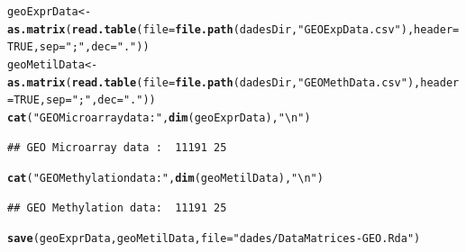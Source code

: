 \documentclass[a4paper,10pt]{article}\usepackage[]{graphicx}\usepackage[]{xcolor}
\makeatletter
\newcommand{\hlnum}[1]{\textcolor[rgb]{0.686,0.059,0.569}{#1}}%
\newcommand{\hlstr}[1]{\textcolor[rgb]{0.192,0.494,0.8}{#1}}%
\newcommand{\hlstd}[1]{\textcolor[rgb]{0.345,0.345,0.345}{#1}}%
\newcommand{\hlkwb}[1]{\textcolor[rgb]{0.69,0.353,0.396}{#1}}%
\newcommand{\hlkwc}[1]{\textcolor[rgb]{0.333,0.667,0.333}{#1}}%
\newcommand{\hlkwd}[1]{\textcolor[rgb]{0.737,0.353,0.396}{\textbf{#1}}}%
\newenvironment{kframe}{%
 \def\at@end@of@kframe{}%
 \ifinner\ifhmode%
  \def\at@end@of@kframe{\end{minipage}}%
  \begin{minipage}{\columnwidth}%
 \fi\fi%
 \def\FrameCommand##1{\hskip\@totalleftmargin \hskip-\fboxsep
 \colorbox{shadecolor}{##1}\hskip-\fboxsep
     \hskip-\linewidth \hskip-\@totalleftmargin \hskip\columnwidth}%
 \MakeFramed {\advance\hsize-\width
   \@totalleftmargin\z@ \linewidth\hsize
   \@setminipage}}%
 {\par\unskip\endMakeFramed%
 \at@end@of@kframe}
\newenvironment{knitrout}{}{} %
\makeatother
\begin{document}
\begin{knitrout}
\color{fgcolor}\begin{kframe}
\begin{alltt}
\hlstd{geoExprData} \hlkwb{<-}  \hlkwd{as.matrix}\hlstd{(}\hlkwd{read.table}\hlstd{(}\hlkwc{file}\hlstd{=}\hlkwd{file.path}\hlstd{(dadesDir,}\hlstr{"GEOExpData.csv"}\hlstd{),} \hlkwc{header}\hlstd{=}\hlnum{TRUE}\hlstd{,} \hlkwc{sep}\hlstd{=}\hlstr{";"}\hlstd{,} \hlkwc{dec}\hlstd{=}\hlstr{"."}\hlstd{))}
\hlstd{geoMetilData} \hlkwb{<-}  \hlkwd{as.matrix}\hlstd{(}\hlkwd{read.table}\hlstd{(}\hlkwc{file}\hlstd{=}\hlkwd{file.path}\hlstd{(dadesDir,}\hlstr{"GEOMethData.csv"}\hlstd{),} \hlkwc{header}\hlstd{=}\hlnum{TRUE}\hlstd{,} \hlkwc{sep}\hlstd{=}\hlstr{";"}\hlstd{,} \hlkwc{dec}\hlstd{=}\hlstr{"."}\hlstd{))}
\hlkwd{cat}\hlstd{(}\hlstr{"GEO Microarray data : "}\hlstd{,} \hlkwd{dim}\hlstd{(geoExprData),} \hlstr{"\textbackslash{}n"}\hlstd{)}
\end{alltt}
\begin{verbatim}
## GEO Microarray data :  11191 25
\end{verbatim}
\begin{alltt}
\hlkwd{cat}\hlstd{(}\hlstr{"GEO Methylation data: "}\hlstd{,} \hlkwd{dim}\hlstd{(geoMetilData),} \hlstr{"\textbackslash{}n"}\hlstd{)}
\end{alltt}
\begin{verbatim}
## GEO Methylation data:  11191 25
\end{verbatim}
\begin{alltt}
\hlkwd{save}\hlstd{(geoExprData, geoMetilData,} \hlkwc{file}\hlstd{=}\hlstr{"dades/DataMatrices-GEO.Rda"}\hlstd{)}
\end{alltt}
\end{kframe}
\end{knitrout}
\end{document}
